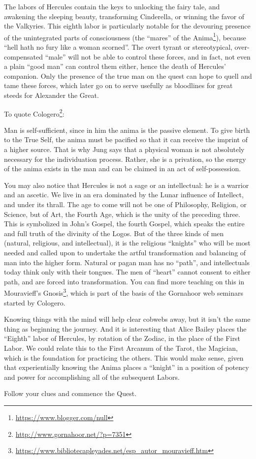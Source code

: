 The labors of Hercules contain the keys to unlocking the fairy tale, and awakening the sleeping beauty, transforming Cinderella, or winning the favor of the Valkyries. This eighth labor is particularly notable for the devouring presence of the unintegrated parts of consciousness (the ``mares'' of the Anima\footnote{\url{https://www.blogger.com/null}}), because ``hell hath no fury like a woman scorned''. The overt tyrant or stereotypical, over-compensated ``male'' will not be able to control these forces, and in fact, not even a plain ``good man'' can control them either, hence the death of Hercules' companion. Only the presence of the true man on the quest can hope to quell and tame these forces, which later go on to serve usefully as bloodlines for great steeds for Alexander the Great.

To quote Cologero\footnote{\url{http://www.gornahoor.net/?p=7351}}:

\begin{quotex}
Man is self-sufficient, since in him the anima is the passive element. To give birth to the True Self, the anima must be pacified so that it can receive the imprint of a higher source. That is why Jung says that a physical woman is not absolutely necessary for the individuation process. Rather, she is a privation, so the energy of the anima exists in the man and can be claimed in an act of self-possession.
\end{quotex}


You may also notice that Hercules is not a sage or an intellectual: he is a warrior and an ascetic. We live in an era dominated by the Lunar influence of Intellect, and under its thrall. The age to come will not be one of Philosophy, Religion, or Science, but of Art, the Fourth Age, which is the unity of the preceding three. This is symbolized in John's Gospel, the fourth Gospel, which speaks the entire and full truth of the divinity of the Logos. But of the three kinds of men (natural, religious, and intellectual), it is the religious ``knights'' who will be most needed and called upon to undertake the artful transformation and balancing of man into the higher form. Natural or pagan man has no ``path'', and intellectuals today think only with their tongues. The men of ``heart'' cannot consent to either path, and are forced into transformation. You can find more teaching on this in Mouravieff's Gnosis\footnote{\url{https://www.bibliotecapleyades.net/esp\_autor\_mouravieff.htm}}, which is part of the basis of the Gornahoor web seminars started by Cologero.

Knowing things with the mind will help clear cobwebs away, but it isn't the same thing as beginning the journey. And it is interesting that Alice Bailey places the ``Eighth'' labor of Hercules, by rotation of the Zodiac, in the place of the First Labor. We could relate this to the First Arcanum of the Tarot, the Magician, which is the foundation for practicing the others. This would make sense, given that experientially knowing the Anima places a ``knight'' in a position of potency and power for accomplishing all of the subsequent Labors.

Follow your clues and commence the Quest.



